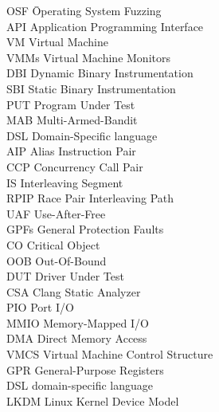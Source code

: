 \begin{tabbing}
    OSF \hspace{0.5cm} \= Operating System Fuzzing \\
    API \> Application Programming Interface \\
    VM   \> Virtual Machine \\
    VMMs \> Virtual Machine Monitors \\
    DBI \> Dynamic Binary Instrumentation \\
    SBI \> Static Binary Instrumentation \\
    PUT \> Program Under Test \\
    MAB \> Multi-Armed-Bandit \\
    DSL \> Domain-Specific language \\
    AIP \> Alias Instruction Pair \\
    CCP \> Concurrency Call Pair \\
    IS  \> Interleaving Segment \\
    RPIP \> Race Pair Interleaving Path \\
    UAF \> Use-After-Free \\
    GPFs \> General Protection Faults \\
    CO \> Critical Object \\
    OOB \> Out-Of-Bound \\
    DUT \> Driver Under Test \\
    CSA \> Clang Static Analyzer \\
    PIO \> Port I/O \\
    MMIO \> Memory-Mapped I/O \\
    DMA \> Direct Memory Access \\
    VMCS \> Virtual Machine Control Structure \\
    GPR \> General-Purpose Registers \\
    DSL \> domain-specific language \\
    LKDM \> Linux Kernel Device Model \\
    \end{tabbing}


\newpage